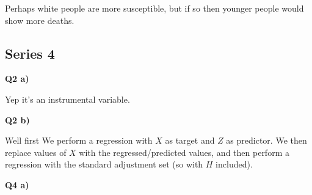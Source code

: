 \documentclass{article}
\begin{document}
			Perhaps white people are more susceptible, but if so then younger people would show more deaths.
			
	\subsection{Series 4}
	
		\textbf{Q2  a)}
			
			Yep it's an instrumental variable.
			
		\textbf{Q2 b)}
			
			Well first We perform a regression with $X$ as target and $Z$ as predictor. We then replace values of $X$ with the regressed/predicted values, and then perform a regression with the standard adjustment set (so with $H$ included).
			
		\textbf{Q4 a)}
		
			
			
			
			
			
			
			
			
			
			
			
\end{document}
